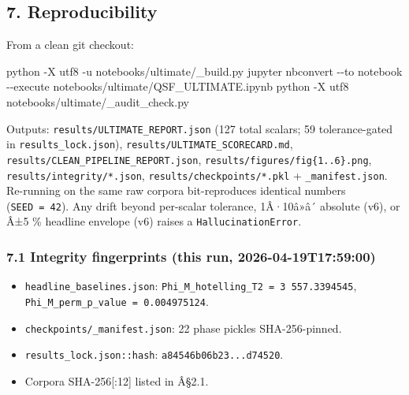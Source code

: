 \documentclass[
]{article}
\newenvironment{Shaded}{}{}
\newcommand{\FunctionTok}[1]{\textcolor[rgb]{0.02,0.16,0.49}{#1}}
\newcommand{\NormalTok}[1]{#1}
\newcommand{\OperatorTok}[1]{\textcolor[rgb]{0.40,0.40,0.40}{#1}}
\providecommand{\tightlist}{%
  \setlength{\itemsep}{0pt}\setlength{\parskip}{0pt}}
\begin{document}
\subsection{7. Reproducibility}\label{reproducibility}

From a clean git checkout:

\begin{Shaded}
\begin{Highlighting}[]
\NormalTok{python }\OperatorTok{{-}}\NormalTok{X utf8 }\OperatorTok{{-}}\NormalTok{u notebooks}\OperatorTok{/}\NormalTok{ultimate}\OperatorTok{/}\NormalTok{\_build}\OperatorTok{.}\FunctionTok{py}
\NormalTok{jupyter nbconvert }\OperatorTok{{-}{-}}\NormalTok{to notebook }\OperatorTok{{-}{-}}\NormalTok{execute notebooks}\OperatorTok{/}\NormalTok{ultimate}\OperatorTok{/}\NormalTok{QSF\_ULTIMATE}\OperatorTok{.}\FunctionTok{ipynb}
\NormalTok{python }\OperatorTok{{-}}\NormalTok{X utf8 notebooks}\OperatorTok{/}\NormalTok{ultimate}\OperatorTok{/}\NormalTok{\_audit\_check}\OperatorTok{.}\FunctionTok{py}
\end{Highlighting}
\end{Shaded}

Outputs: \texttt{results/ULTIMATE\_REPORT.json} (127 total scalars; 59
tolerance-gated in \texttt{results\_lock.json}),
\texttt{results/ULTIMATE\_SCORECARD.md},
\texttt{results/CLEAN\_PIPELINE\_REPORT.json},
\texttt{results/figures/fig\{1..6\}.png},
\texttt{results/integrity/*.json}, \texttt{results/checkpoints/*.pkl} +
\texttt{\_manifest.json}. Re-running on the same raw corpora
bit-reproduces identical numbers (\texttt{SEED\ =\ 42}). Any drift
beyond per-scalar tolerance, 1Â·10â»â´ absolute (v6), or Â±5 \% headline
envelope (v6) raises a \texttt{HallucinationError}.

\subsubsection{7.1 Integrity fingerprints (this run,
2026-04-19T17:59:00)}\label{integrity-fingerprints-this-run-2026-04-19t175900}

\begin{itemize}
\tightlist
\item
  \texttt{headline\_baselines.json}:
  \texttt{Phi\_M\_hotelling\_T2\ =\ 3\ 557.3394545},
  \texttt{Phi\_M\_perm\_p\_value\ =\ 0.004975124}.
\item
  \texttt{checkpoints/\_manifest.json}: 22 phase pickles SHA-256-pinned.
\item
  \texttt{results\_lock.json::hash}: \texttt{a84546b06b23...d74520}.
\item
  Corpora SHA-256{[}:12{]} listed in Â§2.1.
\end{itemize}
\end{document}
